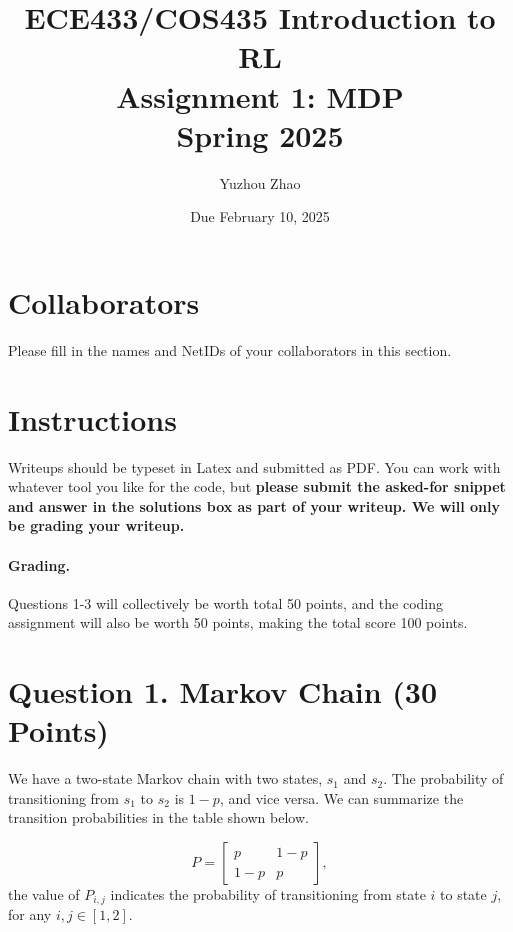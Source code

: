 \documentclass[12pt]{article}
\date{Due February 10, 2025}
\author{\begin{fillme}[width=0.3\textwidth]
Yuzhou Zhao
\end{fillme}} %
\title{ECE433/COS435 Introduction to RL\\
  Assignment 1: MDP\\
  Spring 2025\\
}
\begin{document}
  \maketitle
  \section*{Collaborators}
\begin{fillme}
 Please fill in the names and NetIDs of your collaborators in this section.
\end{fillme}

\section*{Instructions}
Writeups should be typeset in Latex and submitted as PDF. You can work with whatever tool you like for the code, but \textbf{please submit the asked-for snippet and answer in the solutions box as part of your writeup. We will only be grading your writeup.}

\paragraph{Grading.} 
Questions 1-3 will collectively be worth total 50 points, and the coding assignment will also be worth 50 points, making the total score 100 points.

\section*{Question 1. Markov Chain (30 Points)}
We have a two-state Markov chain with two states, $s_1$ and $s_2$. The probability of transitioning from $s_1$ to $s_2$ is $1-p$, and vice versa. We can summarize the transition probabilities in the table shown below.

\[
P = \begin{bmatrix}
p & 1 - p \\
1 - p & p 
\end{bmatrix},
\]
the value of $P_{i,j}$ indicates the probability of transitioning from state $i$ to state $j$, for any $i,j \in [1,2]$.
\end{document}

